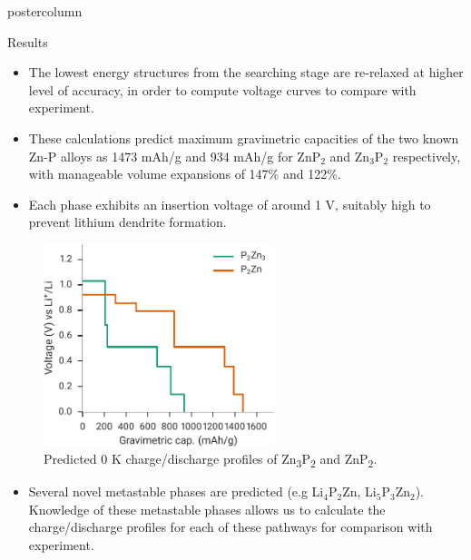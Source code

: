 \documentclass{beamer}
\begin{document}
\begin{frame}
\begin{columns}
\begin{column}{.37\textwidth}
\begin{beamercolorbox}[center]{postercolumn}
\begin{minipage}{.98\textwidth}
{\begin{myblock}{Results}
            \begin{itemize}
                \item The lowest energy structures from the searching stage are re-relaxed at higher level of accuracy, in order to compute voltage curves to compare with experiment.
                \item These calculations predict maximum gravimetric capacities of the two known Zn-P alloys as 1473 mAh/g and 934 mAh/g for ZnP$_2$ and Zn$_3$P$_2$ respectively, with manageable volume expansions of 147\% and 122\%.
                \item Each phase exhibits an insertion voltage of around 1 V, suitably high to prevent lithium dendrite formation.
            \end{itemize}
            \begin{figure}
                \centering
              \includegraphics[width=0.6\textwidth]{img/LiPZn_voltage}
              \caption{Predicted 0 K charge/discharge profiles of Zn\textsubscript{3}P\textsubscript{2} and ZnP\textsubscript{2}.}
            \end{figure}

            \begin{itemize}
                \item Several novel metastable phases are predicted (e.g Li$_4$P$_2$Zn, Li$_5$P$_3$Zn$_2$). Knowledge of these metastable phases allows us to calculate the charge/discharge profiles for each of these pathways for comparison with experiment.
            \end{itemize}


\end{myblock}}
\end{minipage}
\end{beamercolorbox}
\end{column}
\end{columns}
\end{frame}
\end{document}
